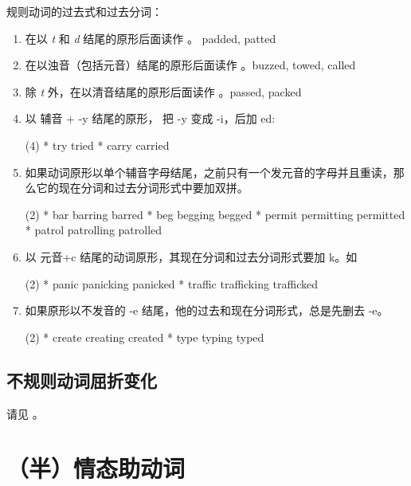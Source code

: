 规则动词的过去式和过去分词：
\begin{enumerate}
\item 在以 \emph{t} 和 \emph{d} 结尾的原形后面读作 。 padded, patted
\item 在以浊音（包括元音）结尾的原形后面读作 。buzzed, towed, called
\item 除 \emph{t} 外，在以清音结尾的原形后面读作 。passed, packed
\item 以 辅音 + -y 结尾的原形， 把 -y 变成 -i，后加 ed:
  \begin{taskitem}(4)
    * try \Rightarrow tried
    * carry  \Rightarrow carried
  \end{taskitem}

\item 如果动词原形以单个辅音字母结尾，之前只有一个发元音的字母并且重读，那么它的现在分词和过去分词形式中要加双拼。
  \begin{taskitem}(2)
    * bar \Rightarrow barring \Rightarrow barred
    * beg \Rightarrow begging \Rightarrow begged
    * permit \Rightarrow permitting \Rightarrow permitted
    * patrol \Rightarrow patrolling \Rightarrow patrolled
  \end{taskitem}

\item 以 元音+c 结尾的动词原形，其现在分词和过去分词形式要加 k。如
  \begin{taskitem}(2)
    * panic \Rightarrow panicking \Rightarrow panicked
    * traffic \Rightarrow trafficking \Rightarrow trafficked
  \end{taskitem}

\item 如果原形以不发音的 -e 结尾，他的过去和现在分词形式，总是先删去 -e。
  \begin{taskitem}(2)
    * create \Rightarrow creating \Rightarrow created
    * type \Rightarrow typing \Rightarrow typed
  \end{taskitem}
\end{enumerate}

\subsection{不规则动词屈折变化}

请见 。

\section{（半）情态助动词}

